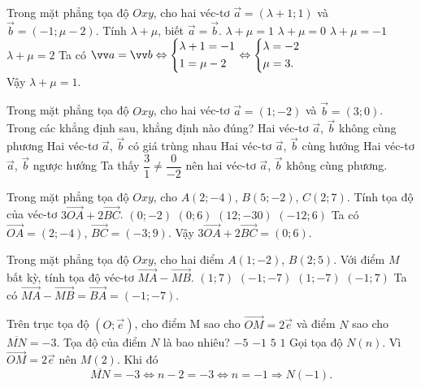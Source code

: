 \begin{ex}%
	Trong mặt phẳng tọa độ $Oxy$, cho hai véc-tơ $\vec{a}=(\lambda+1;1)$ và $\vec{b}=(-1;\mu-2)$. Tính $\lambda+\mu$, biết $\vec{a}=\vec{b}$.
	\choice
	{\True $\lambda+\mu=1$}
	{$\lambda+\mu=0$}
	{$\lambda+\mu=-1$}
	{$\lambda+\mu=2$}
	\loigiai
	{
		Ta có $\vec{a}=\vec{b}\Leftrightarrow \heva{&\lambda+1=-1\\ &1=\mu-2}\Leftrightarrow \heva{&\lambda=-2\\ &\mu=3.}$\\
		Vậy $\lambda+\mu=1$.
	}	
\end{ex}

\begin{ex}%
	Trong mặt phẳng tọa độ $Oxy$, cho hai véc-tơ $\vec{a}=(1;-2)$ và $\vec{b}=(3;0)$. Trong các khẳng định sau, khẳng định nào đúng?
	\choice
	{\True Hai véc-tơ $\vec{a}$, $\vec{b}$ không cùng phương}
	{Hai véc-tơ $\vec{a}$, $\vec{b}$ có giá trùng nhau}
	{Hai véc-tơ $\vec{a}$, $\vec{b}$ cùng hướng}
	{Hai véc-tơ $\vec{a}$, $\vec{b}$ ngược hướng}
	\loigiai
	{
		Ta thấy $\dfrac{3}{1}\neq \dfrac{0}{-2}$ nên hai véc-tơ $\vec{a}$, $\vec{b}$ không cùng phương.
	}	
\end{ex}

\begin{ex}%
	Trong mặt phẳng tọa độ $Oxy$, cho $A(2;-4)$, $B(5;-2)$, $C(2;7)$. Tính tọa độ của véc-tơ $3\vec{OA}+2\vec{BC}$.
	\choice
	{$(0;-2)$}
	{\True $(0;6)$}
	{$(12;-30)$}
	{$(-12;6)$}
	\loigiai
	{
		Ta có $\vec{OA}=(2;-4)$, $\vec{BC}=(-3;9)$. Vậy $3\vec{OA}+2\vec{BC}=(0;6)$.
	}	
\end{ex}

\begin{ex}%
	Trong mặt phẳng tọa độ $Oxy$, cho hai điểm $A(1;-2)$, $B(2;5)$. Với điểm $M$ bất kỳ, tính tọa độ véc-tơ $\vec{MA}-\vec{MB}$. 
	\choice
	{$(1;7)$}
	{\True $(-1;-7)$}
	{$(1;-7)$}
	{$(-1;7)$}
	\loigiai
	{
		Ta có $\vec{MA}-\vec{MB}=\vec{BA}=(-1;-7)$.
	}	
\end{ex}

\begin{ex}%
	Trên trục tọa độ $(O;\vec e)$, cho điểm M sao cho $\vec{OM}=2\vec e$ và điểm $N$ sao cho $\overline{MN}=-3$. Tọa độ của điểm $N$ là bao nhiêu?
	\choice
	{$-5$}
	{\True $-1$}
	{$5$}
	{$1$}
	\loigiai
	{
		Gọi tọa độ $N(n)$. Vì $\vec{OM}=2\vec{e}$ nên $M(2)$. Khi đó
		\[\overline{MN}=-3\Leftrightarrow n-2=-3\Leftrightarrow n=-1\Rightarrow N(-1).\]
	}	
\end{ex}

